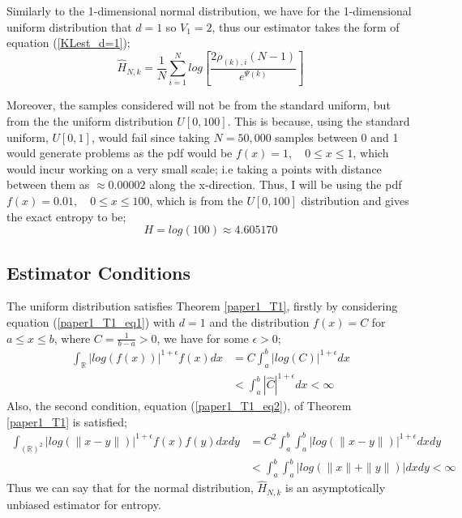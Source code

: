 \documentclass{report}
\begin{document}
 Similarly to the 1-dimensional normal distribution, we have for the 1-dimensional uniform distribution that $d=1$ so $V_{1} = 2$, thus our estimator takes the form of equation (\ref{KLest_d=1});
\begin{equation}
\hat{H}_{N, k} =  \frac{1}{N} \sum_{i=1}^{N} log \left[ \frac{2\rho_{(k),i}(N-1)}{e^{\Psi(k)}} \right]\nonumber
\end{equation}

Moreover, the samples considered will not be from the standard uniform, but from the the uniform distribution $U[0,100]$. This is because, using the standard uniform, $U[0,1]$, would fail since taking $N=50,000$ samples between 0 and 1 would generate problems as the pdf would be $f(x) = 1 , \quad 0 \leq x \leq 1$, which would incur working on a very small scale; i.e taking a points with distance between them as $\approx 0.00002$ along the x-direction. Thus, I will be using the pdf $f(x) = 0.01 , \quad 0 \leq x \leq 100$, which is from the $U[0,100]$ distribution and gives the exact entropy to be;
\begin{equation} \label{uniform_exact}
H = log(100) \approx 4.605170
\end{equation}




\subsection{Estimator Conditions} \label{U_Conditions}

The uniform distribution satisfies Theorem \ref{paper1_T1}, firstly by considering equation (\ref{paper1_T1_eq1}) with $d=1$ and the distribution $f(x)=C$ for $a \leq x \leq b$, where $C = \frac{1}{b-a} >0$, we have for some $\epsilon >0$;
\begin{align} \nonumber
\int_{\mathbb{R}} | log(f(x))|^{1 + \epsilon} f(x) dx  &= C \int_{a}^{b} | log (C) |^{1 + \epsilon} dx \\ \nonumber 
&<  \int_{a}^{b} | \hat{C} |^{1 + \epsilon}  dx  < \infty \nonumber
\end{align}
Also, the second condition, equation (\ref{paper1_T1_eq2}), of Theorem \ref{paper1_T1} is satisfied;
\begin{align} \nonumber
\int_{(\mathbb{R})^2} | log(\|x-y\|)|^{1+ \epsilon} f(x) f(y) dx dy  &= C^2 \int_{a}^{b} \int_{a}^{b} | log(\|x-y\|)|^{1+ \epsilon} dx dy \\ \nonumber
&< \int_{a}^{b} \int_{a}^{b} | log(\|x\| + \|y\|)| dx dy < \infty  \nonumber
\end{align}
Thus we can say that for the normal distribution, $\hat{H}_{N,k}$ is an asymptotically unbiased estimator for entropy. 
\end{document}

